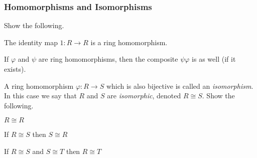 \subsubsection*{Homomorphisms and Isomorphisms}

\begin{exercises}
\ResumeExercises
\item Show the following.
\begin{enumerate*}
\item The identity map $1 : R \rightarrow R$ is a ring homomorphism.
\item If $\varphi$ and $\psi$ are ring homomorphisms, then the composite $\psi\varphi$ is as well (if it exists).
\end{enumerate*}

\item A ring homomorphism $\varphi : R \rightarrow S$ which is also bijective is called an \emph{isomorphism}. In this case we say that $R$ and $S$ are \emph{isomorphic}, denoted $R \cong S$. Show the following.
\begin{enumerate*}
\item $R \cong R$
\item If $R \cong S$ then $S \cong R$
\item If $R \cong S$ and $S \cong T$ then $R \cong T$
\end{enumerate*}
\end{exercises}
